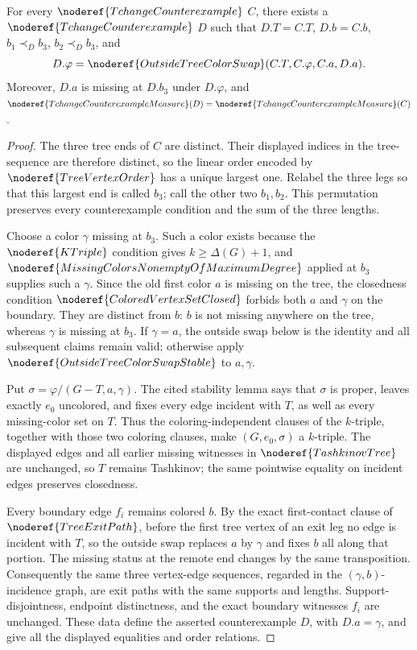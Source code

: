 \begin{lemma}
For every \(\noderef{TchangeCounterexample}\) \(C\), there exists a
\(\noderef{TchangeCounterexample}\) \(D\) such that
\(D.T=C.T\), \(D.b=C.b\),
\(b_1\prec_D b_3\), \(b_2\prec_D b_3\), and
\[
 D.\varphi=\noderef{OutsideTreeColorSwap}
   (C.T,C.\varphi,C.a,D.a).
\]
Moreover, \(D.a\) is missing at \(D.b_3\) under \(D.\varphi\), and
\(\noderef{TchangeCounterexampleMeasure}(D)
=\noderef{TchangeCounterexampleMeasure}(C)\).
\end{lemma}
\begin{proof}
The three tree ends of \(C\) are distinct.  Their displayed indices in
the tree-sequence are therefore distinct, so the linear order encoded by
\(\noderef{TreeVertexOrder}\) has a unique largest one.  Relabel the three
legs so that this largest end is called \(b_3\); call the other two
\(b_1,b_2\).  This permutation preserves every counterexample condition
and the sum of the three lengths.

Choose a color \(\gamma\) missing at \(b_3\).  Such a color exists because
the \(\noderef{KTriple}\) condition gives
\(k\geq\Delta(G)+1\), and
\(\noderef{MissingColorsNonemptyOfMaximumDegree}\) applied at \(b_3\)
supplies such a \(\gamma\).  Since the old first color \(a\)
is missing on the tree, the closedness condition
\(\noderef{ColoredVertexSetClosed}\) forbids both \(a\) and \(\gamma\)
on the boundary.  They are distinct from \(b\): \(b\) is not missing anywhere
on the tree, whereas \(\gamma\) is missing at \(b_3\).  If
\(\gamma=a\), the outside swap below is the identity and all subsequent
claims remain valid; otherwise apply
\(\noderef{OutsideTreeColorSwapStable}\) to \(a,\gamma\).

Put
\(\sigma=\varphi/(G-T,a,\gamma)\).  The cited stability lemma says that
\(\sigma\) is proper, leaves exactly \(e_0\) uncolored, and fixes every
edge incident with \(T\), as well as every missing-color set on \(T\).
Thus the coloring-independent clauses of the \(k\)-triple, together with
those two coloring clauses, make \((G,e_0,\sigma)\) a \(k\)-triple.
The displayed edges and all earlier missing witnesses in
\(\noderef{TashkinovTree}\) are unchanged, so \(T\) remains Tashkinov; the same
pointwise equality on incident edges preserves closedness.

Every boundary edge \(f_i\) remains colored \(b\).  By the exact
first-contact clause of \(\noderef{TreeExitPath}\), before the first tree
vertex of an exit leg no edge is incident with \(T\), so the outside
swap replaces \(a\) by \(\gamma\) and fixes \(b\) all along that portion.
The missing status at the remote end changes by the same transposition.
Consequently the same three vertex-edge sequences, regarded in the
\((\gamma,b)\)-incidence graph, are exit paths with the same supports and
lengths.  Support-disjointness, endpoint distinctness, and the exact
boundary witnesses \(f_i\) are unchanged.  These data define the asserted
counterexample \(D\), with \(D.a=\gamma\), and give all the displayed
equalities and order relations.
\end{proof}
